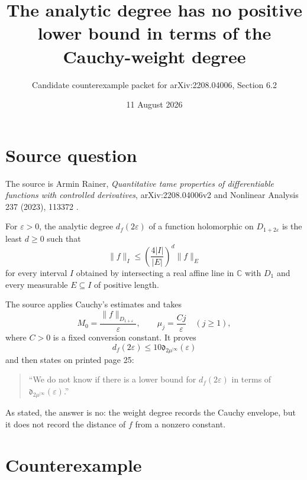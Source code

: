 \documentclass[11pt]{article}
\title{The analytic degree has no positive lower bound in terms of the Cauchy-weight degree}
\author{Candidate counterexample packet for arXiv:2208.04006, Section 6.2}
\date{11 August 2026}
\newcommand{\fd}{\mathfrak d}
\begin{document}
\maketitle

\begin{center}
\end{center}

\section{Source question}

The source is Armin Rainer, \emph{Quantitative tame properties of
differentiable functions with controlled derivatives}, arXiv:2208.04006v2
and Nonlinear Analysis 237 (2023), 113372 \cite{source}.

For $\varepsilon>0$, the analytic degree $d_f(2\varepsilon)$ of a function
holomorphic on $D_{1+2\varepsilon}$ is the least $d\geq0$ such that
\begin{equation}\label{eq:analytic-degree}
 \|f\|_I\leq
 \left(\frac{4|I|}{|E|}\right)^d\|f\|_E
\end{equation}
for every interval $I$ obtained by intersecting a real affine line in
$\mathbb C$ with $D_1$ and every measurable $E\subseteq I$ of positive
length.

The source applies Cauchy's estimates and takes
\begin{equation}\label{eq:weight}
 M_0=\frac{\|f\|_{D_{1+\varepsilon}}}{\varepsilon},
 \qquad \mu_j=\frac{Cj}{\varepsilon}\quad(j\geq1),
\end{equation}
where $C>0$ is a fixed conversion constant.  It proves
\[
 d_f(2\varepsilon)\leq10\fd_{2\mu^{|\infty}}(\varepsilon)
\]
and then states on printed page 25:
\begin{quote}
``We do not know if there is a lower bound for $d_f(2\varepsilon)$ in terms
of $\fd_{2\mu^{|\infty}}(\varepsilon)$.''
\end{quote}

As stated, the answer is no: the weight degree records the Cauchy envelope,
but it does not record the distance of $f$ from a nonzero constant.

\section{Counterexample}
\end{document}
